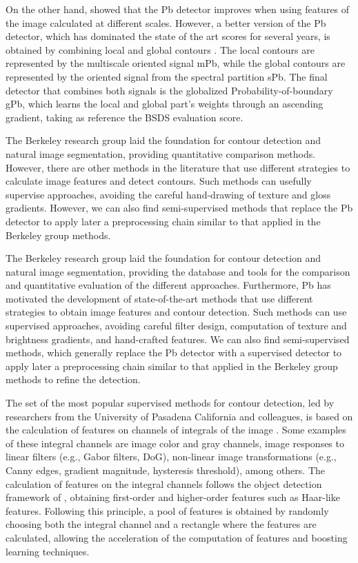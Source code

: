 On the other hand, \cite{Ren:ECCV:2008} showed that the Pb detector improves when using features of the image calculated at different scales. However, a better version of the Pb detector, which has dominated the state of the art scores for several years, is obtained by combining local and global contours \citep{Maire.Arbelaez.ea:CVPR:2008}. The local contours are represented by the multiscale oriented signal mPb, while the global contours are represented by the oriented signal from the spectral partition sPb. The final detector that combines both signals is the globalized Probability-of-boundary gPb, which learns the local and global part's weights through an ascending gradient, taking as reference the BSDS evaluation score.

The Berkeley research group laid the foundation for contour detection and natural image segmentation, providing quantitative comparison methods. However, there are other methods in the literature that use different strategies to calculate image features and detect contours. Such methods can usefully supervise approaches, avoiding the careful hand-drawing of texture and gloss gradients. However, we can also find semi-supervised methods that replace the Pb detector to apply later a preprocessing chain similar to that applied in the Berkeley group methods.

The Berkeley research group laid the foundation for contour detection and natural image segmentation, providing the database and tools for the comparison and quantitative evaluation of the different approaches. Furthermore, Pb has motivated the development of state-of-the-art methods that use different strategies to obtain image features and contour detection. Such methods can use supervised approaches, avoiding careful filter design, computation of texture and brightness gradients, and hand-crafted features. We can also find semi-supervised methods, which generally replace the Pb detector with a supervised detector to apply later a preprocessing chain similar to that applied in the Berkeley group methods to refine the detection.

The set of the most popular supervised methods for contour detection, led by researchers from the University of Pasadena California and colleagues, is based on the calculation of features on channels of integrals of the image \citep{Dollar.Tu.ea:BMVC:2009}. Some examples of these integral channels are image color and gray channels, image responses to linear filters (e.g., Gabor filters, DoG), non-linear image transformations (e.g., Canny edges, gradient magnitude, hysteresis threshold), among others. The calculation of features on the integral channels follows the object detection framework of \cite{Viola.Jones:IJCV:2004}, obtaining first-order and higher-order features such as Haar-like features. Following this principle, a pool of features is obtained by randomly choosing both the integral channel and a rectangle where the features are calculated, allowing the acceleration of the computation of features and boosting learning techniques. 

